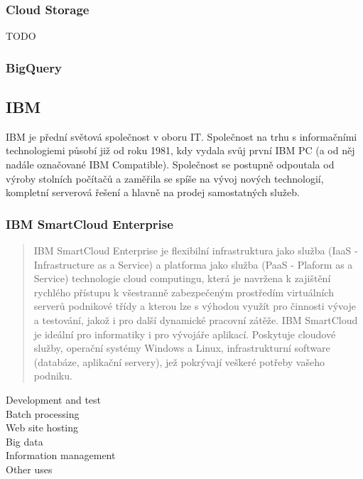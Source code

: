 \subsubsection{Cloud Storage}
TODO

\subsubsection{BigQuery}

\subsection{IBM}
IBM je přední světová společnost v oboru IT. Společnost na trhu s informačními technologiemi působí již od roku 1981, kdy vydala svůj první IBM PC (a od něj nadále označované IBM Compatible). Společnost se postupně odpoutala od výroby stolních počítačů a zaměřila se spíše na vývoj nových technologií, kompletní serverová řešení a hlavně na prodej samostatných služeb.

\subsubsection{IBM SmartCloud Enterprise}
\begin{quote}
IBM SmartCloud Enterprise je flexibilní infrastruktura jako služba (IaaS - Infrastructure as a Service) a platforma jako služba (PaaS - Plaform as a Service) technologie cloud computingu, která je navržena k zajištění rychlého přístupu k všestranně zabezpečeným prostředím virtuálních serverů podnikové třídy a kterou lze s výhodou využít pro činnosti vývoje a testování, jakož i pro další dynamické pracovní zátěže. IBM SmartCloud je ideální pro informatiky i pro vývojáře aplikací. Poskytuje cloudové služby, operační systémy Windows a Linux, infrastrukturní software (databáze, aplikační servery), jež pokrývají veškeré potřeby vašeho podniku.\cite{ibm:smartCloudEnt}
\end{quote}

\begin{description}
	\item[Development and test]
	\item[Batch processing]
	\item[Web site hosting]
	\item[Big data]
	\item[Information management]
	\item[Other uses]
\end{description}

